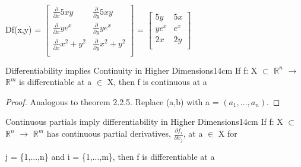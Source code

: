     \begin{tbox}
        Df(x,y) =
        $\begin{bmatrix}
            \frac{\partial}{\partial x} 5xy
            & \frac{\partial}{\partial y} 5xy \\
            
            \frac{\partial}{\partial x} ye^x
            & \frac{\partial}{\partial y} ye^x \\
            
            \frac{\partial}{\partial x} x^2+y^2
            & \frac{\partial}{\partial y} x^2+y^2 \\
        \end{bmatrix}$
        = $\begin{bmatrix}
            5y & 5x \\
            
            ye^x & e^x \\
            
            2x & 2y \\
        \end{bmatrix}$
    \end{tbox}

    \vspace{0.5cm}



    \begin{wtheorem}{Differentiability implies Continuity in Higher Dimensions}{14cm}
        If f: X $\subset$ $\mathbb{R}^n$ $\rightarrow$ $\mathbb{R}^m$
        is differentiable at a $\in$ X, then f is continuous at a
    \end{wtheorem}

    \begin{proof}
        Analogous to {\color{red} theorem 2.2.5}. Replace (a,b) with
        a = $(a_1,...,a_n)$.
    \end{proof}

    \newpage



    \begin{wtheorem}{Continuous partials imply differentiability
    in Higher Dimensions}{14cm}
        If f: X $\subset$ $\mathbb{R}^n$ $\rightarrow$ $\mathbb{R}^m$
        has continuous partial derivatives, $\frac{\partial f_i}{\partial x_j}$,
        at a $\in$ X for
        
        j = \{1,...,n\} and i = \{1,...,m\}, then f is differentiable at a
    \end{wtheorem}

